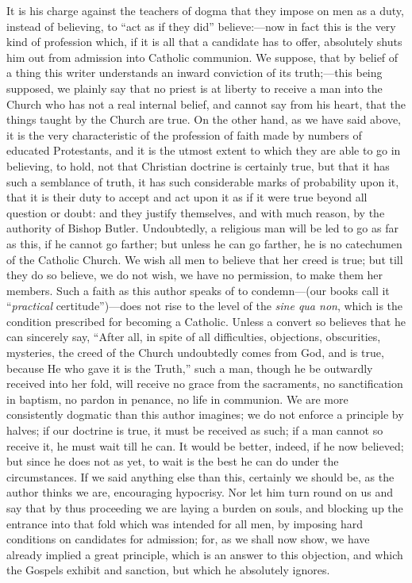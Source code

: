 It is his charge against the teachers of dogma
that they impose on men as a duty, instead of believing, to ``act as if
they did'' believe:—now in fact this is the very kind of profession
which, if it is all that a candidate has to offer, absolutely shuts
him out from admission into Catholic communion. We suppose, that by
belief of a thing this writer understands an inward conviction of its
truth;—this being supposed, we plainly say that no priest is at
liberty to receive a man into the Church who has not a real internal
belief, and cannot say from his heart, that the things taught by the
Church are true. On the other hand, as we have said above, it is the
very characteristic of the profession of faith made by numbers of
educated Protestants, and it is the utmost extent to which they are
able to go in believing, to hold, not that Christian doctrine is
certainly true, but that it has such a semblance of truth, it has such
considerable marks of probability upon it, that it is their duty to
accept and act upon it as if it were true beyond all question or
doubt: and they justify themselves, and with much reason, by the
authority of Bishop Butler. Undoubtedly, a religious man will be led
to go as far as this, if he cannot go farther; but unless he can go
farther, he is no catechumen of the Catholic Church. We wish all men
to believe that her creed is true; but till they do so believe, we do
not wish, we have no permission, to make them her members. Such a
faith as this author speaks of to condemn—(our books call it ``\emph{practical}
certitude'')—does not rise to the level of the \emph{sine qua non},
which is the condition prescribed for becoming a Catholic. Unless a
convert so believes that he can sincerely say, ``After all, in spite of
all difficulties, objections, obscurities, mysteries, the creed of the
Church undoubtedly comes from God, and is true, because He who gave it
is the Truth,'' such a man, though he be outwardly received into her
fold, will receive no grace from the sacraments, no sanctification in
baptism, no pardon in penance, no life in communion. We are more
consistently dogmatic than this author imagines; we do not enforce a
principle by halves; if our doctrine is true, it must be received as
such; if a man cannot so receive it, he must wait till he can. It
would be better, indeed, if he now believed; but since he does not as
yet, to wait is the best he can do under the circumstances. If we said
anything else than this, certainly we should be, as the author thinks
we are, encouraging hypocrisy. Nor let him turn round on us and say
that by thus proceeding we are laying a burden on souls, and blocking
up the entrance into that fold which was intended for all men, by
imposing hard conditions on candidates for admission; for, as we shall
now show, we have already implied a great principle, which is an
answer to this objection, and which the Gospels exhibit and sanction,
but which he absolutely ignores.

